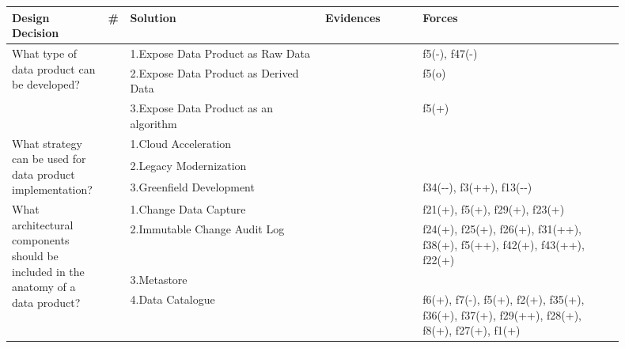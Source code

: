 \begin{tabular}{|p{0.12\linewidth}|p{0.015\linewidth}|p{0.3\linewidth}|p{0.15\linewidth}|p{0.31\linewidth}|}
\hline
{\bf Design Decision} & {\bf \#} & {\bf Solution} & {\bf Evidences} & {\bf Forces}\\
\hline
\multirow{3}{\linewidth}{What type of data product can be developed?} &\cellcolor{emerald_shape_4}{} &1.Expose Data Product as Raw Data&\cellcolor{emerald_shape_7}{s1, s2, s6, s7, s9, s14, s15, s27, s34, s43, i1, i3, i4, i5, i6} & f5(-), f47(-)\\
 & \cellcolor{emerald_shape_4}{} & 2.Expose Data Product as Derived Data&\cellcolor{emerald_shape_6}{s1, s2, s6, s9, s14, s15, s27, s34, i2, i4} & f5(o)\\
 & \multirow{-3}{\linewidth}{ \cellcolor{emerald_shape_4}{16}} &3.Expose Data Product as an algorithm&\cellcolor{emerald_shape_3}{s2, s6, i5} & f5(+)\\
\multirow{3}{\linewidth}{What strategy can be used for data product implementation?} &\cellcolor{emerald_shape_6}{} &1.Cloud Acceleration&\cellcolor{emerald_shape_1}{} & \\
 & \cellcolor{emerald_shape_6}{} & 2.Legacy Modernization&\cellcolor{emerald_shape_1}{} & \\
 & \multirow{-3}{\linewidth}{ \cellcolor{emerald_shape_6}{40}} &3.Greenfield Development&\cellcolor{emerald_shape_7}{s1, s2, s3, s5, s6, s7, s8, s9, s11, s14, s15, s18, s20, s23, s25, s28, s30, s31, s32, s33, s35, s37, s38, s39, s40, s41, s42, s43, s45, s49, i1, i2, i3} & f34(-{}-), f3(++), f13(-{}-)\\
\multirow{8}{\linewidth}{What architectural components should be included in the anatomy of a data product?} &\cellcolor{emerald_shape_6}{} &1.Change Data Capture&\cellcolor{emerald_shape_4}{s4, s17, s20, s38, s45, s48, s53, s54, s55, s56, i2, i3} & f21(+), f5(+), f29(+), f23(+)\\
 & \cellcolor{emerald_shape_6}{} & 2.Immutable Change Audit Log&\cellcolor{emerald_shape_5}{s4, s8, s12, s31, s32, s35, s36, s45, s47, s48, s53, s54, s55, s56, s57, i1, i2, i3, i4} & f24(+), f25(+), f26(+), f31(++), f38(+), f5(++), f42(+), f43(++), f22(+)\\
 & \cellcolor{emerald_shape_6}{} & 3.Metastore&\cellcolor{emerald_shape_2}{i1, i4, i5, i6} & \\
 & \cellcolor{emerald_shape_6}{} & 4.Data Catalogue&\cellcolor{emerald_shape_6}{s1, s3, s5, s7, s9, s15, s16, s25, s30, s31, s32, s37, s43, s47, s48, s53, s55, i1, i3, i4, i5, i6} & f6(+), f7(-), f5(+), f2(+), f35(+), f36(+), f37(+), f29(++), f28(+), f8(+), f27(+), f1(+)\\

\end{tabular}
